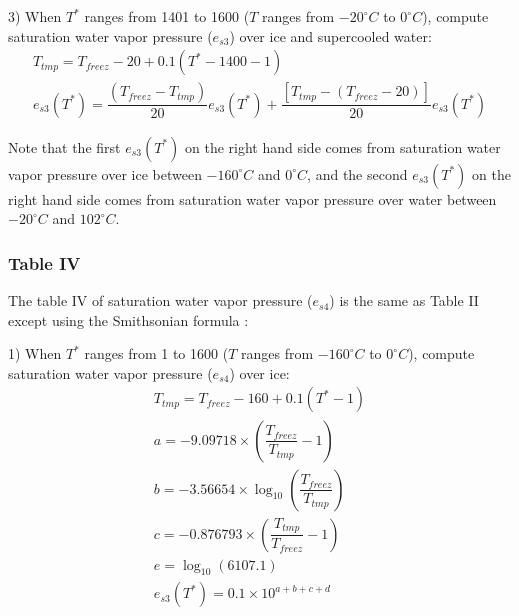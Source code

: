 \documentclass[letterpaper,titlepage,10pt]{article}
\numberwithin{equation}{section}
\begin{document}
3) When $T^*$ ranges from 1401 to 1600 ($T$ ranges from $-20^\circ C$ to $0^\circ C$), compute saturation water vapor pressure ($e_{s3}$) over ice and supercooled water:
\begin{gather}
	T_{tmp} = T_{freez} - 20 + 0.1\left( T^* - 1400 - 1 \right) \\
	e_{s3}(T^*) = \dfrac{\left(T_{freez} - T_{tmp} \right)}{20} e_{s3}(T^*) + \dfrac{\left[T_{tmp} - \left(T_{freez} - 20 \right) \right]}{20} e_{s3}(T^*)
\end{gather}

Note that the first $e_{s3}(T^*)$ on the right hand side comes from saturation water vapor pressure over ice between $-160^\circ C$ and $0^\circ C$, and the second $e_{s3}(T^*)$ on the right hand side comes from saturation water vapor pressure over water between $-20^\circ C$ and $102^\circ C$.


\subsubsection*{Table IV}

The table IV of saturation water vapor pressure ($e_{s4}$) is the same as Table II except using the Smithsonian formula \citet{smithsonian1951smith}:

1) When $T^*$ ranges from 1 to 1600 ($T$ ranges from $-160^\circ C$ to $0^\circ C$), compute saturation water vapor pressure ($e_{s4}$) over ice:
\begin{gather}
	T_{tmp} = T_{freez} - 160 + 0.1\left( T^* - 1 \right) \\
	a = - 9.09718 \times \left(\dfrac{T_{freez}}{T_{tmp}} - 1 \right) \\
	b = - 3.56654 \times \log_{10} \left(\dfrac{T_{freez}}{T_{tmp}} \right) \\
	c = - 0.876793 \times \left(\dfrac{T_{tmp}}{T_{freez}} - 1 \right) \\
	e = \log_{10} \left(6107.1 \right) \\
	e_{s3}(T^*) = 0.1 \times 10^{a + b + c + d}
\end{gather}
\end{document}
